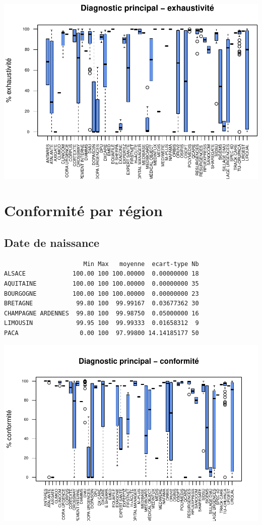 \documentclass[]{article}
\begin{document}
\includegraphics{septembre2015_files/figure-latex/unnamed-chunk-23-1.pdf}

\section{Conformité par région}\label{conformite-par-region}

\subsection{Date de naissance}\label{date-de-naissance-1}

\begin{verbatim}
                      Min Max   moyenne  ecart-type Nb
ALSACE             100.00 100 100.00000  0.00000000 18
AQUITAINE          100.00 100 100.00000  0.00000000 35
BOURGOGNE          100.00 100 100.00000  0.00000000 23
BRETAGNE            99.80 100  99.99167  0.03677362 30
CHAMPAGNE ARDENNES  99.80 100  99.98750  0.05000000 16
LIMOUSIN            99.95 100  99.99333  0.01658312  9
PACA                 0.00 100  97.99800 14.14185177 50
\end{verbatim}

\includegraphics{septembre2015_files/figure-latex/unnamed-chunk-24-1.pdf}
\end{document}
